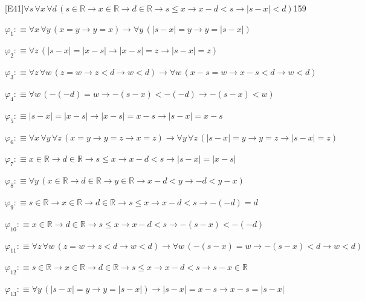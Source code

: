\begin{fullproof}{[E41]}{$\forall s\,\forall x\,\forall d\,(s \in \mathbb{R} \to x \in \mathbb{R} \to d \in \mathbb{R} \to s \leq x \to x - d < s \to \lvert s - x \rvert < d)$}{159}
\begin{ptree}
\end{ptree}
\begin{abbrevlist}
\item $\varphi_{1} :\equiv \forall x\,\forall y\,(x = y \to y = x) \to \forall y\,(\lvert s - x \rvert = y \to y = \lvert s - x \rvert)$
\item $\varphi_{2} :\equiv \forall z\,(\lvert s - x \rvert = \lvert x - s \rvert \to \lvert x - s \rvert = z \to \lvert s - x \rvert = z)$
\item $\varphi_{3} :\equiv \forall z\,\forall w\,(z = w \to z < d \to w < d) \to \forall w\,(x - s = w \to x - s < d \to w < d)$
\item $\varphi_{4} :\equiv \forall w\,(-(-d) = w \to -(s - x) < -(-d) \to -(s - x) < w)$
\item $\varphi_{5} :\equiv \lvert s - x \rvert = \lvert x - s \rvert \to \lvert x - s \rvert = x - s \to \lvert s - x \rvert = x - s$
\item $\varphi_{6} :\equiv \forall x\,\forall y\,\forall z\,(x = y \to y = z \to x = z) \to \forall y\,\forall z\,(\lvert s - x \rvert = y \to y = z \to \lvert s - x \rvert = z)$
\item $\varphi_{7} :\equiv x \in \mathbb{R} \to d \in \mathbb{R} \to s \leq x \to x - d < s \to \lvert s - x \rvert = \lvert x - s \rvert$
\item $\varphi_{8} :\equiv \forall y\,(x \in \mathbb{R} \to d \in \mathbb{R} \to y \in \mathbb{R} \to x - d < y \to -d < y - x)$
\item $\varphi_{9} :\equiv s \in \mathbb{R} \to x \in \mathbb{R} \to d \in \mathbb{R} \to s \leq x \to x - d < s \to -(-d) = d$
\item $\varphi_{10} :\equiv x \in \mathbb{R} \to d \in \mathbb{R} \to s \leq x \to x - d < s \to -(s - x) < -(-d)$
\item $\varphi_{11} :\equiv \forall z\,\forall w\,(z = w \to z < d \to w < d) \to \forall w\,(-(s - x) = w \to -(s - x) < d \to w < d)$
\item $\varphi_{12} :\equiv s \in \mathbb{R} \to x \in \mathbb{R} \to d \in \mathbb{R} \to s \leq x \to x - d < s \to s - x \in \mathbb{R}$
\item $\varphi_{13} :\equiv \forall y\,(\lvert s - x \rvert = y \to y = \lvert s - x \rvert) \to \lvert s - x \rvert = x - s \to x - s = \lvert s - x \rvert$

\end{abbrevlist}
\end{fullproof}
